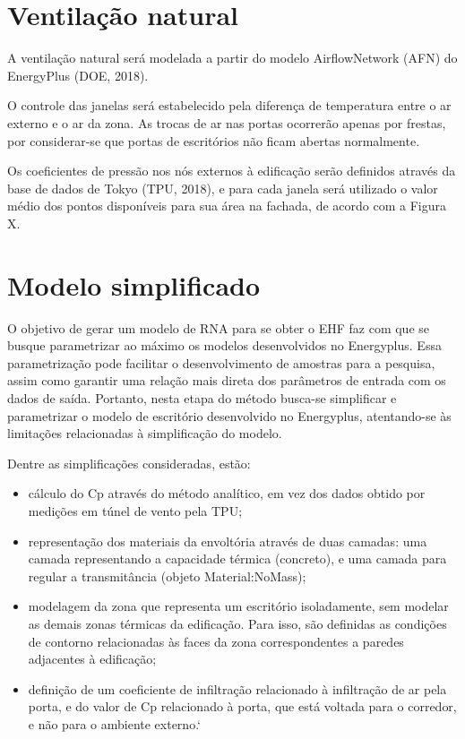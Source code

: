 \documentclass[brazil,hardcopy,openany,a5paper]{ufscthesis}
\begin{document}
	\section{Ventilação natural}
	
	A ventilação natural será modelada a partir do modelo AirflowNetwork (AFN) do EnergyPlus (DOE, 2018).
	
	O controle das janelas será estabelecido pela diferença de temperatura entre o ar externo e o ar da zona. As trocas de ar nas portas ocorrerão apenas por frestas, por considerar-se que portas de escritórios não ficam abertas normalmente.
	
	Os coeficientes de pressão nos nós externos à edificação serão definidos através da base de dados de Tokyo (TPU, 2018), e para cada janela será utilizado o valor médio dos pontos disponíveis para sua área na fachada, de acordo com a Figura X.
	
	\section{Modelo simplificado}
	
	O objetivo de gerar um modelo de RNA para se obter o EHF faz com que se busque parametrizar ao máximo os modelos desenvolvidos no Energyplus. Essa parametrização pode facilitar o desenvolvimento de amostras para a pesquisa, assim como garantir uma relação mais direta dos parâmetros de entrada com os dados de saída. Portanto, nesta etapa do método busca-se simplificar e parametrizar o modelo de escritório desenvolvido no Energyplus, atentando-se às limitações relacionadas à simplificação do modelo.
	
	Dentre as simplificações consideradas, estão:
	
	\begin{itemize}
		\item cálculo do Cp através do método analítico, em vez dos dados obtido por medições em túnel de vento pela TPU;
		\item representação dos materiais da envoltória através de duas camadas: uma camada representando a capacidade térmica (concreto), e uma camada para regular a transmitância (objeto Material:NoMass);
		\item modelagem da zona que representa um escritório isoladamente, sem modelar as demais zonas térmicas da edificação. Para isso, são definidas as condições de contorno relacionadas às faces da zona correspondentes a paredes adjacentes à edificação;
		\item definição de um coeficiente de infiltração relacionado à infiltração de ar pela porta, e do valor de Cp relacionado à porta, que está voltada para o corredor, e não para o ambiente externo.`
	\end{itemize}
	
\end{document}
